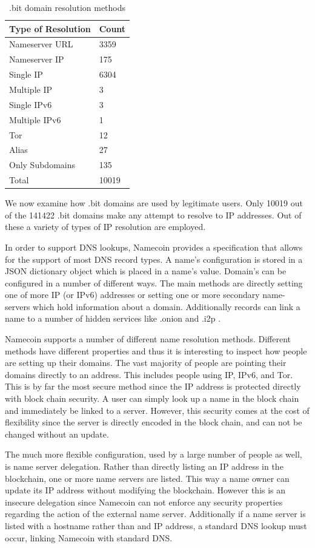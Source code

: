 \begin{table}[t]
\begin{tabular}{ll}
Type of Resolution & Count \\ \hline
Nameserver URL     & 3359  \\
Nameserver IP      & 175   \\
Single IP          & 6304  \\
Multiple IP        & 3     \\
Single IPv6        & 3     \\
Multiple IPv6      & 1     \\
Tor                & 12    \\
Alias              & 27    \\
Only Subdomains    & 135   \\ \hline
Total              & 10019
\end{tabular}
\caption{.bit domain resolution methods}
\end{table}

We now examine how .bit domains are used by legitimate users. Only 10019 out of the 141422 .bit domains make any attempt to resolve to IP addresses. Out of these a variety of types of IP resolution are employed.

In order to support DNS lookups, Namecoin provides a specification that allows for the support of most DNS record types. A name's configuration is stored in a JSON dictionary object which is placed in a name's value. Domain's can be configured in a number of different ways. The main methods are directly setting one of more IP (or IPv6) addresses or setting one or more secondary name-servers which hold information about a domain. Additionally records can link a name to a number of hidden services like .onion \cite{onion} and .i2p \cite{i2p}.

Namecoin supports a number of different name resolution methods. Different methods have different properties and thus it is interesting to inspect how people are setting up their domains. The vast majority of people are pointing their domains directly to an address. This includes people using IP, IPv6, and Tor. This is by far the most secure method since the IP address is protected directly with block chain security. A user can simply look up a name in the block chain and immediately be linked to a server. However, this security comes at the cost of flexibility since the server is directly encoded in the block chain, and can not be changed without an update.


The much more flexible configuration, used by a large number of people as well, is name server delegation. Rather than directly listing an IP address in the blockchain, one or more name servers are listed. This way a name owner can update its IP address without modifying the blockchain. However this is an insecure delegation since Namecoin can not enforce any security properties regarding the action of the external name server. Additionally if a name server is listed with a hostname rather than and IP address, a standard DNS lookup must occur, linking Namecoin with standard DNS.

